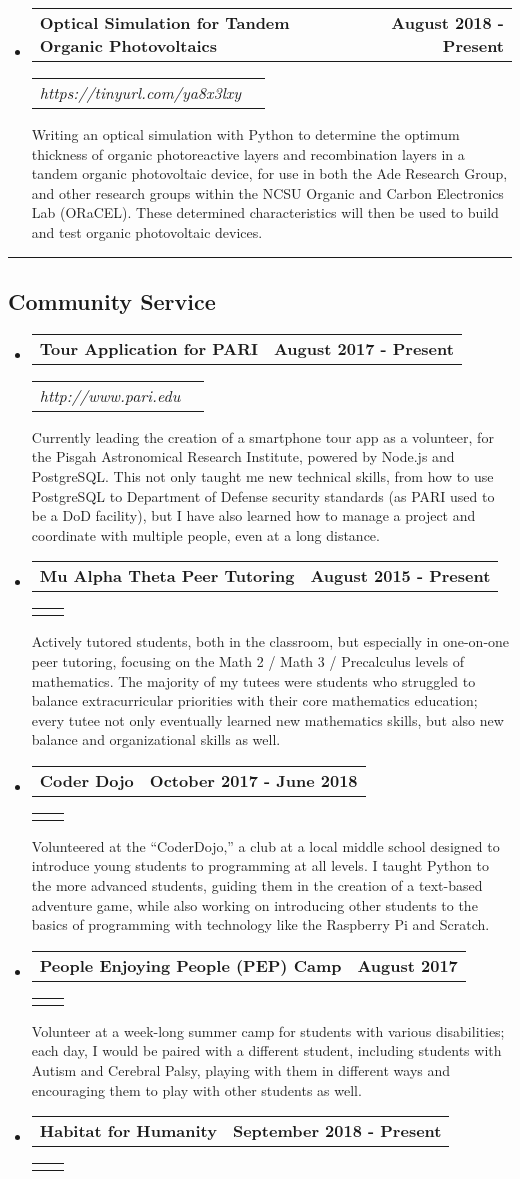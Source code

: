 \documentclass[10pt,letterpaper]{article}
\makeatletter
\newcommand{\headerrow}[2]
{\begin{tabular*}{\linewidth}{l@{\extracolsep{\fill}}r}
	#1 &
	#2 \\
\end{tabular*}}
\newcommand{\basicitem}[5]
{
	\item
	\headerrow
		{\textbf{#1}}
		{\textbf{#2}}
	\ifthenelse{\equal{#3}{} \AND \equal{#4}{}}
		{}
		{
			\headerrow
			{\emph{#3}}
			{\emph{#4}}
		}
	#5
}
\makeatother
\begin{document}
\begin{itemize}
	\basicitem
		{Optical Simulation for Tandem Organic Photovoltaics}
		{August 2018 - Present}
		{https://tinyurl.com/ya8x3lxy}
		{}
		{Writing an optical simulation with Python to determine the optimum thickness of organic photoreactive layers and recombination layers in a tandem organic photovoltaic device, for use in both the Ade Research Group, and other research groups within the NCSU Organic and Carbon Electronics Lab (ORaCEL). These determined characteristics will then be used to build and test organic photovoltaic devices.}

\end{itemize}

\hrule
\vspace{-0.4em}
\subsection*{Community Service}
\begin{itemize}
	\parskip=0.1em

	\basicitem
		{Tour Application for PARI}
		{August 2017 - Present}
		{http://www.pari.edu}
		{}
		{Currently leading the creation of a smartphone tour app as a volunteer, for the Pisgah Astronomical Research Institute, powered by Node.js and PostgreSQL. This not only taught me new technical skills, from how to use PostgreSQL to Department of Defense security standards (as PARI used to be a DoD facility), but I have also learned how to manage a project and coordinate with multiple people, even at a long distance.}

	\basicitem
		{Mu Alpha Theta Peer Tutoring}
		{August 2015 - Present}
		{}
		{}
		{Actively tutored students, both in the classroom, but especially in one-on-one peer tutoring, focusing on the Math 2 / Math 3 / Precalculus levels of mathematics. The majority of my tutees were students who struggled to balance extracurricular priorities with their core mathematics education; every tutee not only eventually learned new mathematics skills, but also new balance and organizational skills as well.}

	\basicitem
		{Coder Dojo}
		{October 2017 - June 2018}
		{}
		{}
		{Volunteered at the “CoderDojo,” a club at a local middle school designed to introduce young students to programming at all levels. I taught Python to the more advanced students, guiding them in the creation of a text-based adventure game, while also working on introducing other students to the basics of programming with technology like the Raspberry Pi and Scratch.}

	\basicitem
		{People Enjoying People (PEP) Camp}
		{August 2017}
		{}
		{}
		{Volunteer at a week-long summer camp for students with various disabilities; each day, I would be paired with a different student, including students with Autism and Cerebral Palsy, playing with them in different ways and encouraging them to play with other students as well.}

	\basicitem
		{Habitat for Humanity}
		{September 2018 - Present}
		{}
		{}
		{}
	
\end{itemize}
\end{document}
